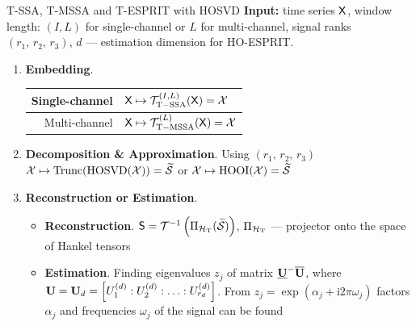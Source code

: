 \documentclass[pdf, unicode, ucs, notheorems]{beamer}
\theoremstyle{definition}
\begin{document}
\begin{frame}{T-SSA, T-MSSA and T-ESPRIT with HOSVD}
  \textbf{Input:} time series $\mathsf{X}$,
  window length: $(I, L)$ for single-channel or $L$ for multi-channel,
  signal ranks $(r_1,\, r_2,\, r_3)$, $d$ --- estimation dimension
  for HO-ESPRIT.
  \vspace{0.4cm}\\
  \begin{enumerate}
    \item \textbf{Embedding}.
      \begin{tabular}{r|l}
        Single-channel & $\mathsf{X} \mapsto\mathcal{T}_{\mathrm{T-SSA}}^{(I,
        L)}(\mathsf{X}) = \mathcal{X}$ \\ \hline
        Multi-channel &
        $\mathsf{X} \mapsto \mathcal{T}_{\mathrm{T-MSSA}}^{(L)}(\mathsf{X}) = \mathcal{X}$
      \end{tabular}
      \vspace{0.2cm}

    \item \textbf{Decomposition \& Approximation}. Using $(r_1,\,
      r_2,\, r_3)$\\\smallskip
      $\mathcal{X} \mapsto
      \operatorname{Trunc}(\operatorname{HOSVD}(\mathcal{X})) =
      \widetilde{\mathcal{S}}$ or
      $\mathcal{X} \mapsto \operatorname{HOOI}(\mathcal{X}) = \widetilde{\mathcal{S}}$
      \vspace{0.2cm}

    \item \textbf{Reconstruction or Estimation}. \\
      \begin{itemize}
        \item \textbf{Reconstruction}.
          $\mathsf{S} = \mathcal{T}^{-1}
          \left(\Pi_{\mathcal{H}_{\mathrm{T}}} (\widetilde{\mathcal{S}})\right)$,
          $\Pi_{\mathcal{H}_{\mathrm{T}}}$ --- projector onto the space of
          Hankel tensors
        \item \textbf{Estimation}. Finding eigenvalues $z_j$ of
          matrix $\underline{\mathbf{U}}^{-}\overline{\mathbf{U}}$, where
          $\mathbf{U} = \mathbf{U}_d = \left[U_1^{(d)}:U_2^{(d)}:\ldots
          :U_{r_d}^{(d)}\right]$.
          From $z_j = \exp(\alpha_j + \mathrm{i}2\pi\omega_j)$
          factors $\alpha_j$ and frequencies $\omega_j$ of
          the signal can be found
      \end{itemize}
  \end{enumerate}
\end{frame}
\end{document}
